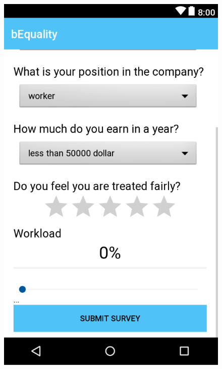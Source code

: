 \documentclass[portrait,a4paper]{article}
\begin{document}
\begin{figure}[!htb]
			\endminipage\hfill
  				\includegraphics[width=\linewidth]{Bilder/App_3_Survey_2}
  				

\end{figure}
\end{document}

